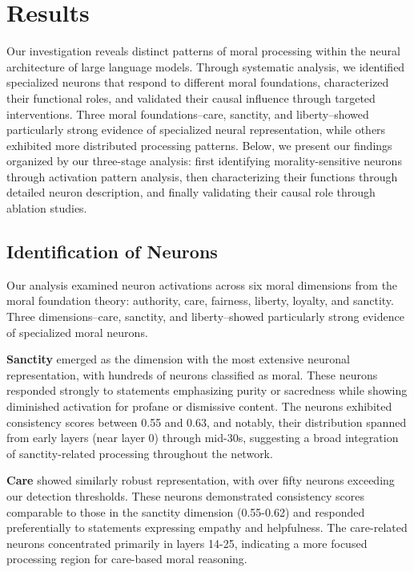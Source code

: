 \documentclass[runninghheads]{llncs}
\begin{document}
\section{Results}
\label{results}

Our investigation reveals distinct patterns of moral processing within the neural architecture of large language models. Through systematic analysis, we identified specialized neurons that respond to different moral foundations, characterized their functional roles, and validated their causal influence through targeted interventions. Three moral foundations--care, sanctity, and liberty--showed particularly strong evidence of specialized neural representation, while others exhibited more distributed processing patterns. Below, we present our findings organized by our three-stage analysis: first identifying morality-sensitive neurons through activation pattern analysis, then characterizing their functions through detailed neuron description, and finally validating their causal role through ablation studies.


\subsection{Identification of Neurons}

Our analysis examined neuron activations across six moral dimensions from the moral foundation theory: authority, care, fairness, liberty, loyalty, and sanctity. Three dimensions--care, sanctity, and liberty--showed particularly strong evidence of specialized moral neurons.

\textbf{Sanctity} emerged as the dimension with the most extensive neuronal representation, with hundreds of neurons classified as moral. These neurons responded strongly to statements emphasizing purity or sacredness while showing diminished activation for profane or dismissive content. The neurons exhibited consistency scores between 0.55 and 0.63, and notably, their distribution spanned from early layers (near layer 0) through mid-30s, suggesting a broad integration of sanctity-related processing throughout the network.

\textbf{Care} showed similarly robust representation, with over fifty neurons exceeding our detection thresholds. These neurons demonstrated consistency scores comparable to those in the sanctity dimension (0.55-0.62) and responded preferentially to statements expressing empathy and helpfulness. The care-related neurons concentrated primarily in layers 14-25, indicating a more focused processing region for care-based moral reasoning.
\end{document}
